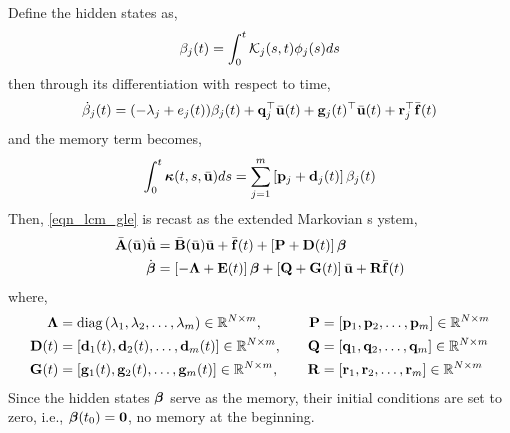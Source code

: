 Define the hidden states as,
\begin{equation}
    \beta_j(t) = \int_{0}^{t}\mathcal{K}_j(s,t)\phi_j(s)ds
\end{equation}
then through its differentiation with respect to time,
\begin{equation}
    \dot{\beta}_j(t) = (-\lambda_j + e_j(t))\beta_j(t) + \mathbf{q}_j^{\top}\bar{\mathbf{u}}(t) + \mathbf{g}_j(t)^{\top}\bar{\mathbf{u}}(t) + \mathbf{r}_j^{\top}\bar{\mathbf{f}}(t)
\end{equation}
and the memory term becomes,
\begin{equation}
    \int_{0}^{t}\boldsymbol{\kappa}(t,s,\bar{\mathbf{u}})ds = \sum_{j=1}^{m}\left[\mathbf{p}_j + \mathbf{d}_j(t)\right]\beta_j(t)
\end{equation}
Then, \cref{eqn_lcm_gle} is recast as the extended Markovian s ystem,
\begin{subequations}
    \begin{align}
        \bar{\mathbf{A}}(\bar{\mathbf{u}})\dot{\bar{\mathbf{u}}} &= \bar{\mathbf{B}}(\bar{\mathbf{u}})\bar{\mathbf{u}} + \bar{\mathbf{f}}(t) + \left[\mathbf{P} + \mathbf{D}(t)\right]\boldsymbol{\beta} \\
        \dot{\boldsymbol{\beta}} &= \left[-\boldsymbol{\Lambda} + \mathbf{E}(t)\right]\boldsymbol{\beta} + \left[\mathbf{Q} + \mathbf{G}(t)\right]\bar{\mathbf{u}} + \mathbf{R}\bar{\mathbf{f}}(t)
    \end{align}
\end{subequations}
where,
\begin{subequations}
    \begin{align}
        \boldsymbol{\Lambda} &= \text{diag}\left(\lambda_1,\lambda_2,\dots,\lambda_m\right)\in\mathbb{R}^{N\times m},\quad & \mathbf{P} &= \left[\mathbf{p}_1,\mathbf{p}_2,\dots,\mathbf{p}_m\right]\in\mathbb{R}^{N\times m}\\
        \mathbf{D}(t) &= \left[\mathbf{d}_1(t),\mathbf{d}_2(t),\dots,\mathbf{d}_m(t)\right]\in\mathbb{R}^{N\times m},\quad & \mathbf{Q} &= \left[\mathbf{q}_1,\mathbf{q}_2,\dots,\mathbf{q}_m\right]\in\mathbb{R}^{N\times m}\\
        \mathbf{G}(t) &= \left[\mathbf{g}_1(t),\mathbf{g}_2(t),\dots,\mathbf{g}_m(t)\right]\in\mathbb{R}^{N\times m},\quad & \mathbf{R} &= \left[\mathbf{r}_1,\mathbf{r}_2,\dots,\mathbf{r}_m\right]\in\mathbb{R}^{N\times m}
    \end{align}
\end{subequations}
Since the hidden states $\boldsymbol{\beta}$ serve as the memory, their initial conditions are set to zero, i.e., $\boldsymbol{\beta}(t_0) = \boldsymbol{0}$, no memory at the beginning.

